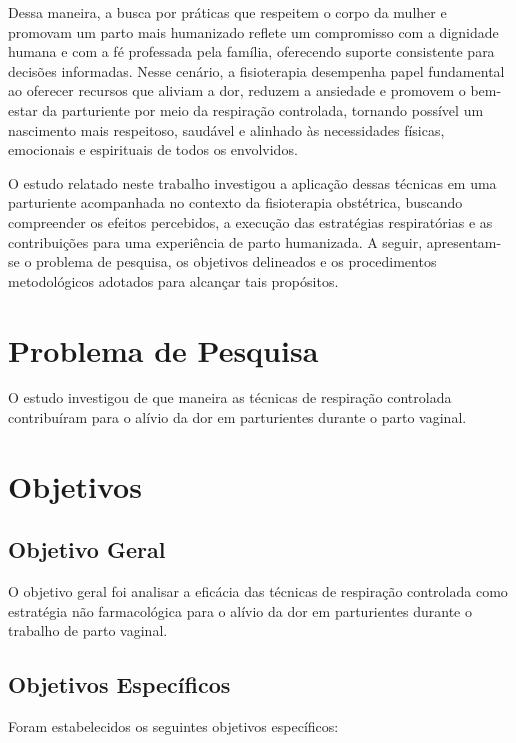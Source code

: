 \documentclass[openright]{normas-utf-tex}
\begin{document}
Dessa maneira, a busca por práticas que respeitem o corpo da mulher e promovam um parto mais humanizado reflete um compromisso com a dignidade humana e com a fé professada pela família, oferecendo suporte consistente para decisões informadas. Nesse cenário, a fisioterapia desempenha papel fundamental ao oferecer recursos que aliviam a dor, reduzem a ansiedade e promovem o bem-estar da parturiente por meio da respiração controlada, tornando possível um nascimento mais respeitoso, saudável e alinhado às necessidades físicas, emocionais e espirituais de todos os envolvidos.

O estudo relatado neste trabalho investigou a aplicação dessas técnicas em uma parturiente acompanhada no contexto da fisioterapia obstétrica, buscando compreender os efeitos percebidos, a execução das estratégias respiratórias e as contribuições para uma experiência de parto humanizada. A seguir, apresentam-se o problema de pesquisa, os objetivos delineados e os procedimentos metodológicos adotados para alcançar tais propósitos.

\section{Problema de Pesquisa}
\label{sec:problema}

O estudo investigou de que maneira as técnicas de respiração controlada contribuíram para o alívio da dor em parturientes durante o parto vaginal.

\section{Objetivos}
\label{sec:objetivos}

\subsection{Objetivo Geral}
\label{subsec:objetivo-geral}

O objetivo geral foi analisar a eficácia das técnicas de respiração controlada como estratégia não farmacológica para o alívio da dor em parturientes durante o trabalho de parto vaginal.

\subsection{Objetivos Específicos}
\label{subsec:objetivos-especificos}

Foram estabelecidos os seguintes objetivos específicos:
\end{document}
